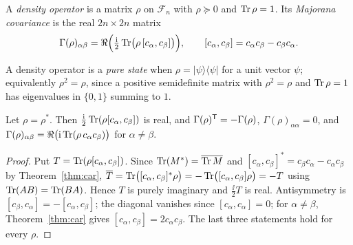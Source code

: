 \begin{definition}\label{def:density}
A \emph{density operator} is a matrix $\rho$ on $\mathcal F_n$ with $\rho\succeq0$ and
$\operatorname{Tr}\rho=1$. Its \emph{Majorana covariance} is the real $2n\times2n$ matrix
\begin{equation}\label{eq:covariance}
 \Gamma(\rho)_{\alpha\beta}=\Re\Bigl(\tfrac{\mathrm i}{2}\operatorname{Tr}\bigl(\rho\,[c_\alpha,c_\beta]\bigr)\Bigr),
 \qquad [c_\alpha,c_\beta]=c_\alpha c_\beta-c_\beta c_\alpha .
\end{equation}
\end{definition}
A density operator is a \emph{pure state} when $\rho=|\psi\rangle\langle\psi|$ for a unit
vector $\psi$; equivalently $\rho^2=\rho$, since a positive
semidefinite matrix with $\rho^2=\rho$ and $\operatorname{Tr}\rho=1$ has eigenvalues in $\{0,1\}$ summing
to $1$.

\begin{theorem}\label{thm:reality}
Let $\rho=\rho^*$. Then $\tfrac{\mathrm i}{2}\operatorname{Tr}(\rho[c_\alpha,c_\beta])$ is real, and
$\Gamma(\rho)^{\mathsf T}=-\Gamma(\rho)$, $\Gamma(\rho)_{\alpha\alpha}=0$, and
$\Gamma(\rho)_{\alpha\beta}=\Re\bigl(\mathrm i\operatorname{Tr}(\rho\,c_\alpha c_\beta)\bigr)$ for $\alpha\neq\beta$.
\end{theorem}
\begin{proof}
Put $T=\operatorname{Tr}(\rho[c_\alpha,c_\beta])$. Since $\operatorname{Tr}(M^*)=\overline{\operatorname{Tr} M}$ and
$[c_\alpha,c_\beta]^*=c_\beta c_\alpha-c_\alpha c_\beta$ by Theorem~\ref{thm:car},
$\overline T=\operatorname{Tr}\bigl([c_\alpha,c_\beta]^*\rho\bigr)=-\operatorname{Tr}\bigl([c_\alpha,c_\beta]\rho\bigr)=-T$
using $\operatorname{Tr}(AB)=\operatorname{Tr}(BA)$. Hence $T$ is purely imaginary and $\tfrac{\ii}{2}T$ is real.
Antisymmetry is $[c_\beta,c_\alpha]=-[c_\alpha,c_\beta]$; the diagonal vanishes since
$[c_\alpha,c_\alpha]=0$; for $\alpha\neq\beta$, Theorem~\ref{thm:car} gives
$[c_\alpha,c_\beta]=2c_\alpha c_\beta$. The last three statements hold for every $\rho$.
\end{proof}


